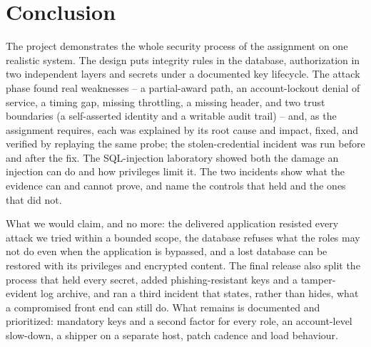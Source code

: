\documentclass[10pt,a4paper]{article}
\begin{document}
\section{Conclusion}\label{sec:concl}
The project demonstrates the whole security process of the assignment on one realistic system. The design puts integrity rules in the database, authorization in two independent layers and secrets under a documented key lifecycle. The attack phase found real weaknesses -- a partial-award path, an account-lockout denial of service, a timing gap, missing throttling, a missing header, and two trust boundaries (a self-asserted identity and a writable audit trail) -- and, as the assignment requires, each was explained by its root cause and impact, fixed, and verified by replaying the same probe; the stolen-credential incident was run before and after the fix. The SQL-injection laboratory showed both the damage an injection can do and how privileges limit it. The two incidents show what the evidence can and cannot prove, and name the controls that held and the ones that did not.

What we would claim, and no more: the delivered application resisted every attack we tried within a bounded scope, the database refuses what the roles may not do even when the application is bypassed, and a lost database can be restored with its privileges and encrypted content. The final release also split the process that held every secret, added phishing-resistant keys and a tamper-evident log archive, and ran a third incident that states, rather than hides, what a compromised front end can still do. What remains is documented and prioritized: mandatory keys and a second factor for every role, an account-level slow-down, a shipper on a separate host, patch cadence and load behaviour.

\end{document}
